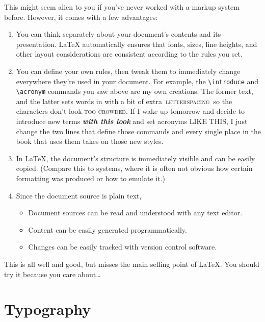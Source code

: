 This might seem alien to you if you've never worked with a markup system before.
However, it comes with a few advantages:
\begin{enumerate}
\item You can think separately about your document's contents and
    its presentation.
    \LaTeX{} automatically ensures that fonts, sizes, line heights,
    and other layout considerations are consistent according to the rules you set.
\item You can define your own rules, then tweak them to immediately change
    everywhere they're used in your document.
    For example, the \verb|\introduce| and \verb|\acronym| commands you saw above
    are my own creations. The former  text, and
    the latter sets words in  with a bit of extra
    \,\textsc{letterspacing}\, so the characters
    don't look \textsc{too crowded}.
    If I wake up tomorrow and decide to introduce new terms
    \textbf{\itshape with this look} and set acronyms
    {\small{} LIKE THIS},
    I just change the two lines that define those commands
    and every single place in the book that uses them takes on those new styles.
\item In \LaTeX, the document's structure is immediately visible
    and can be easily copied.
    (Compare this to  systems, where it is often not obvious
    how certain formatting was produced
    or how to emulate it.)
\item Since the document source is plain text,
    \begin{itemize}
    \item Document sources can be read and understood with any text editor.
    \item Content can be easily generated programmatically.
    \item Changes can be easily tracked with version control software.
    \end{itemize}
\end{enumerate}

This is all well and good,
but misses the main selling point of \LaTeX.
You should try it because you care about\ldots

\chapter{Typography}
\label{typography}


